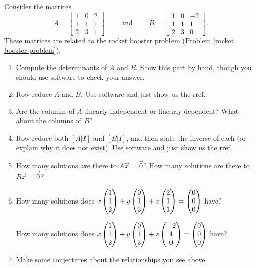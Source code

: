 \begin{problem}

Consider the matrices 
$$
A=
\begin{bmatrix}
1 & 0 & 2  \\
1 & 1 & 1  \\
2 & 3 & 1 
\end{bmatrix}
\quad\quad\text{ and }\quad\quad
B=
\begin{bmatrix}
1 & 0 &  -2 \\
1 & 1 &  1 \\
2 & 3 &  0
\end{bmatrix}.$$
%
These matrices are related to the rocket booster problem (Problem \ref{rocket booster problem}).
\begin{enumerate}
 \item Compute the determinants of $A$ and $B$. Show this part by hand, though you should use software to check your answer. 
 \item Row reduce $A$ and $B$. Use software and just show us the rref.
 \item Are the columns of $A$ linearly independent or linearly dependent? What about the columns of $B$?
 \item Row reduce both $[A|I]$ and $[B|I]$, and then state the inverse of each (or explain why it does not exist).  Use software and just show us the rref.   
 \item How many solutions are there to $A\vec x = \vec 0$?  How many solutions are there to $B\vec x=\vec 0$?
 \item How many solutions does 
$x\begin{pmatrix} 1\\1\\2 \end{pmatrix}+
y\begin{pmatrix} 0\\1\\3 \end{pmatrix}+
z\begin{pmatrix} 2\\1\\1 \end{pmatrix}=
\begin{pmatrix} 0\\0\\0 \end{pmatrix}
$ have?

How many solutions does 
$x\begin{pmatrix} 1\\1\\2 \end{pmatrix}+
y\begin{pmatrix} 0\\1\\3 \end{pmatrix}+
z\begin{pmatrix} -2\\1\\0 \end{pmatrix}=
\begin{pmatrix} 0\\0\\0 \end{pmatrix}
$ have?
\item Make some conjectures about the relationships you see above. 

\end{enumerate}
\end{problem}


